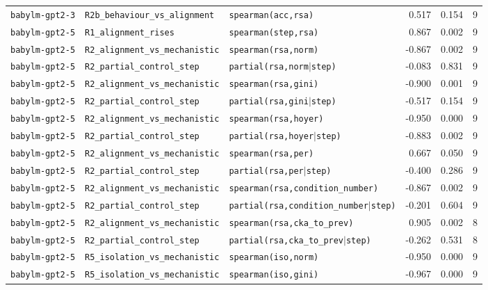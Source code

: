 \begin{longtable}{lllrrr}
\texttt{babylm-gpt2-3} & \texttt{R2b\_behaviour\_vs\_alignment} & \texttt{spearman(acc,rsa)} & 0.517 & 0.154 & 9 \\
\texttt{babylm-gpt2-5} & \texttt{R1\_alignment\_rises} & \texttt{spearman(step,rsa)} & 0.867 & 0.002 & 9 \\
\texttt{babylm-gpt2-5} & \texttt{R2\_alignment\_vs\_mechanistic} & \texttt{spearman(rsa,norm)} & -0.867 & 0.002 & 9 \\
\texttt{babylm-gpt2-5} & \texttt{R2\_partial\_control\_step} & \texttt{partial(rsa,norm$\mid$step)} & -0.083 & 0.831 & 9 \\
\texttt{babylm-gpt2-5} & \texttt{R2\_alignment\_vs\_mechanistic} & \texttt{spearman(rsa,gini)} & -0.900 & 0.001 & 9 \\
\texttt{babylm-gpt2-5} & \texttt{R2\_partial\_control\_step} & \texttt{partial(rsa,gini$\mid$step)} & -0.517 & 0.154 & 9 \\
\texttt{babylm-gpt2-5} & \texttt{R2\_alignment\_vs\_mechanistic} & \texttt{spearman(rsa,hoyer)} & -0.950 & 0.000 & 9 \\
\texttt{babylm-gpt2-5} & \texttt{R2\_partial\_control\_step} & \texttt{partial(rsa,hoyer$\mid$step)} & -0.883 & 0.002 & 9 \\
\texttt{babylm-gpt2-5} & \texttt{R2\_alignment\_vs\_mechanistic} & \texttt{spearman(rsa,per)} & 0.667 & 0.050 & 9 \\
\texttt{babylm-gpt2-5} & \texttt{R2\_partial\_control\_step} & \texttt{partial(rsa,per$\mid$step)} & -0.400 & 0.286 & 9 \\
\texttt{babylm-gpt2-5} & \texttt{R2\_alignment\_vs\_mechanistic} & \texttt{spearman(rsa,condition\_number)} & -0.867 & 0.002 & 9 \\
\texttt{babylm-gpt2-5} & \texttt{R2\_partial\_control\_step} & \texttt{partial(rsa,condition\_number$\mid$step)} & -0.201 & 0.604 & 9 \\
\texttt{babylm-gpt2-5} & \texttt{R2\_alignment\_vs\_mechanistic} & \texttt{spearman(rsa,cka\_to\_prev)} & 0.905 & 0.002 & 8 \\
\texttt{babylm-gpt2-5} & \texttt{R2\_partial\_control\_step} & \texttt{partial(rsa,cka\_to\_prev$\mid$step)} & -0.262 & 0.531 & 8 \\
\texttt{babylm-gpt2-5} & \texttt{R5\_isolation\_vs\_mechanistic} & \texttt{spearman(iso,norm)} & -0.950 & 0.000 & 9 \\
\texttt{babylm-gpt2-5} & \texttt{R5\_isolation\_vs\_mechanistic} & \texttt{spearman(iso,gini)} & -0.967 & 0.000 & 9 \\

\end{longtable}
